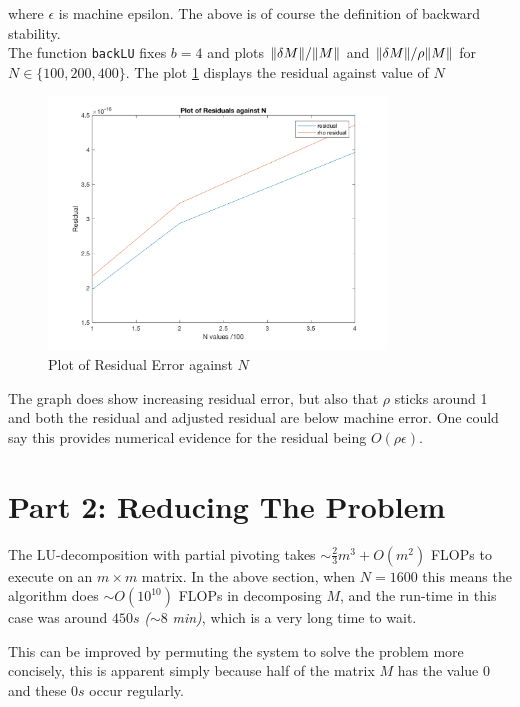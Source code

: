 \documentclass[paper=a4, fontsize=12pt]{scrartcl} %
\numberwithin{equation}{section}       %
\numberwithin{figure}{section}         %
\numberwithin{table}{section}          %
\begin{document}
\noindent where $\epsilon$ is machine epsilon. The above is of course the definition of backward stability.\\

\noindent The function \texttt{backLU} fixes $b=4$ and plots $\norm{\delta M}/\norm{ M}$ and $\norm{\delta M}/\rho\norm{M}$ for $N\in \{100,200,400\}$. The plot \ref{fig:residualplot} displays the residual against value of $N$

\begin{figure}[h!]
  \centering
  \includegraphics[width=0.8\textwidth]{residual_plot.png}
  \caption{Plot of Residual Error against $N$} 
  \label{fig:residualplot}
\end{figure}

\noindent The graph does show increasing residual error, but also that $\rho$ sticks around 1 and both the residual and adjusted residual are below machine error. One could say this provides numerical evidence for the residual being  $O(\rho\epsilon)$.


\section{Part 2: Reducing The Problem}
The LU-decomposition with partial pivoting takes $\sim \frac{2}{3}m^3 + O(m^2)$ FLOPs to execute on an $m\times m$ matrix. In the above section, when $N=1600$ this means the algorithm does $\sim O(10^{10})$ FLOPs in decomposing $M$, and the run-time in this case was around $450s$ \textit{(}$\sim 8$ \textit{min)}, which is a very long time to wait. 

\indent This can be improved by permuting the system to solve the problem more concisely, this is apparent simply because half of the matrix $M$ has the value $0$ and these $0s$ occur regularly. 
\end{document}

